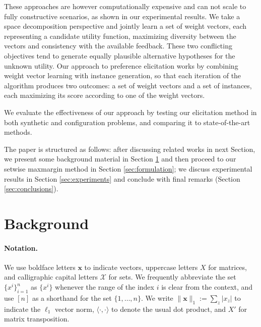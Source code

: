 \documentclass{article}
\renewcommand\[{\begin{equation}}
\renewcommand\]{\end{equation}}
\newcommand{\calvar}[1]{\ensuremath{\mathcal{#1}}}
\newcommand{\calX}{\calvar{X}}
\newcommand{\vecvar}[1]{\ensuremath{\boldsymbol{#1}}}
\newcommand{\vx}{\vecvar{x}}
\begin{document}
These
approaches are however computationally expensive and can not scale to
fully constructive scenarios, as shown in our experimental results.
We take a space decomposition perspective and jointly learn a set of
weight vectors, each representing a candidate utility function,
maximizing diversity between the vectors and consistency with the
available feedback. These two conflicting objectives tend to generate
equally plausible alternative hypotheses for the unknown
utility. 
Our approach to preference elicitation works by combining weight vector
learning with instance generation, so that each iteration of the
algorithm produces two outcomes: a set of weight vectors and a set of
instances, each maximizing its score according to one of the weight
vectors. 

We evaluate the effectiveness of our approach by testing our elicitation method
in both synthetic and configuration problems, and comparing it to state-of-the-art
methods.

The paper is structured as follows: after discussing related works in next Section,
we present some background material in Section \ref{sec:background} 
and then proceed to our setwise maxmargin method in Section \ref{sec:formulation}; 
we discuss experimental results in Section \ref{sec:experiments}
and conclude with final remarks (Section \ref{sec:conclusions}).




\section{Background}
\label{sec:background}

\paragraph{Notation.} We use boldface letters $\vx$ to indicate vectors,
uppercase letters $X$ for matrices, and calligraphic capital letters $\calX$
for sets. We frequently abbreviate the set $\{ x^i \}_{i=1}^n$ as $\{ x^i \}$
whenever the range of the index $i$ is clear from the context, and use $[n]$ as
a shorthand for the set $\{1, \ldots, n\}$. We write $\|\vx\|_1 := \sum_z |x_z|$
to indicate the $\ell_1$ vector norm, $\langle \cdot, \cdot \rangle$ to
denote the usual dot product, and $X'$ for matrix transposition.
\end{document}

